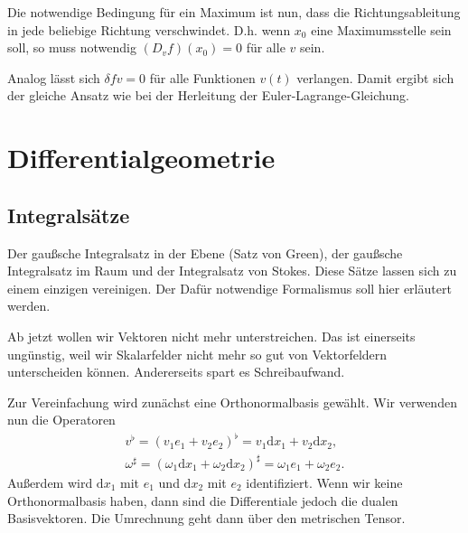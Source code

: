 \documentclass[a4paper,10pt,fleqn,twocolumn,twoside]{article}
\begin{document}
Die notwendige Bedingung für ein Maximum ist nun, dass die
Richtungsableitung in jede beliebige Richtung verschwindet. D.h.
wenn $x_0$ eine Maximumsstelle sein soll, so muss notwendig
$(D_v f)(x_0)=0$ für alle $v$ sein.

Analog lässt sich
$\delta fv=0$ für alle Funktionen $v(t)$ verlangen.
Damit ergibt sich der gleiche Ansatz wie bei der Herleitung
der Euler-Lagrange-Gleichung.


\newpage
\section{Differentialgeometrie}

\subsection{Integralsätze}

Der gaußsche Integralsatz in der Ebene (Satz von Green), der gaußsche
Integralsatz im Raum und der Integralsatz von Stokes. Diese
Sätze lassen sich zu einem einzigen vereinigen. Der Dafür notwendige
Formalismus soll hier erläutert werden.

Ab jetzt wollen wir Vektoren nicht mehr unterstreichen. Das ist
einerseits ungünstig, weil wir Skalarfelder nicht mehr so gut von
Vektorfeldern unterscheiden können. Andererseits spart es
Schreibaufwand.

Zur Vereinfachung wird zunächst eine Orthonormalbasis gewählt.
Wir verwenden nun die Operatoren
\begin{gather*}
v^\flat = (v_1e_1+v_2e_2)^\flat
= v_1\mathrm dx_1+v_2\mathrm dx_2,\\
\omega^\sharp
= (\omega_1\mathrm dx_1+\omega_2\mathrm dx_2)^\sharp
= \omega_1e_1+\omega_2e_2.
\end{gather*}
Außerdem wird $\mathrm dx_1$ mit $e_1$ und $\mathrm dx_2$
mit $e_2$ identifiziert. Wenn wir keine Orthonormalbasis haben,
dann sind die Differentiale jedoch die dualen Basisvektoren.
Die Umrechnung geht dann über den metrischen Tensor.
\end{document}
